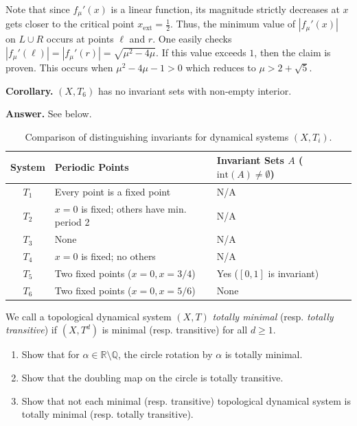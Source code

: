 \documentclass{template}
\begin{document}
Note that since $f_{\mu}'(x)$ is a linear function, its magnitude strictly
decreases at $x$ gets closer to the critical point $x_{\text{ext}}=\frac{1}{2}$.
Thus, the minimum value of $|f_{\mu}'(x)|$ on $L \cup R$ occurs at points $\ell$
and $r$. One easily checks $|f_{\mu}'(\ell)| = |f_{\mu}'(r)| =
\sqrt{\mu^2-4\mu}$. If this value exceeds $1$, then the claim is proven. 
This occurs when $\mu^2-4\mu-1>0$ which reduces to $\mu>2+\sqrt{5}$.

\textbf{Corollary.} $(X,T_6)$ has no invariant sets with non-empty interior.

\textbf{Answer.} See  below.

\begin{table}[htpb]
    \centering
    \renewcommand{\arraystretch}{1.3}
    \begin{tabular}{cll}
        \hline
        \textbf{System} & \textbf{Periodic Points} & \textbf{Invariant Sets $A$ ($\text{int}(A) \neq \emptyset$)} \\
        \hline
        $T_1$ & Every point is a fixed point & N/A \\
        \hline
        $T_2$ & $x=0$ is fixed; others have min. period 2 & N/A \\
        \hline
        $T_3$ & None & N/A \\
        \hline
        $T_4$  & $x=0$ is fixed; no others & N/A \\
        \hline
        $T_5$  & Two fixed points ($x=0, x=3/4$) & Yes ($[0,1]$ is invariant) \\
        \hline
        $T_6$  & Two fixed points ($x=0, x=5/6$) & None \\
        \hline
    \end{tabular}
    \caption{Comparison of distinguishing invariants for dynamical systems $(X, T_i)$.}
    \label{tab:system_comparison}
\end{table}

\newpage

\begin{problem}[Exercise 4]
    We call a topological dynamical system $(X,T)$ \textit{totally minimal}
    (resp. \textit{totally transitive}) if $(X,T^d)$ is minimal (resp. transitive)
    for all $d \geq 1$. 
    \begin{enumerate}
        \item[(a)] Show that for $\alpha \in \mathbb{R} \setminus \mathbb{Q}$, the 
        circle rotation by $\alpha$ is totally minimal.
        \item[(b)] Show that the doubling map on the circle is totally transitive.
        \item[(c)] Show that not each minimal (resp. transitive) topological
        dynamical system is totally minimal (resp. totally transitive). 
    \end{enumerate}
\end{problem}
\end{document}
